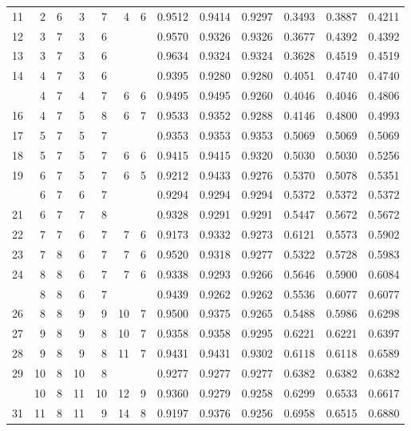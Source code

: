 \begin{Schunk}
\begin{longtable}{rrrrrrrrrrrrr}
11 & 2 & 6 & 3 & 7 & 4 & 6 & 0.9512 & 0.9414 & 0.9297 & 0.3493 & 0.3887 & 0.4211\\
12 & 3 & 7 & 3 & 6 &  &  & 0.9570 & 0.9326 & 0.9326 & 0.3677 & 0.4392 & 0.4392\\
13 & 3 & 7 & 3 & 6 &  &  & 0.9634 & 0.9324 & 0.9324 & 0.3628 & 0.4519 & 0.4519\\
14 & 4 & 7 & 3 & 6 &  &  & 0.9395 & 0.9280 & 0.9280 & 0.4051 & 0.4740 & 0.4740\\
\addlinespace
15 & 4 & 7 & 4 & 7 & 6 & 6 & 0.9495 & 0.9495 & 0.9260 & 0.4046 & 0.4046 & 0.4806\\
16 & 4 & 7 & 5 & 8 & 6 & 7 & 0.9533 & 0.9352 & 0.9288 & 0.4146 & 0.4800 & 0.4993\\
17 & 5 & 7 & 5 & 7 &  &  & 0.9353 & 0.9353 & 0.9353 & 0.5069 & 0.5069 & 0.5069\\
18 & 5 & 7 & 5 & 7 & 6 & 6 & 0.9415 & 0.9415 & 0.9320 & 0.5030 & 0.5030 & 0.5256\\
19 & 6 & 7 & 5 & 7 & 6 & 5 & 0.9212 & 0.9433 & 0.9276 & 0.5370 & 0.5078 & 0.5351\\
\addlinespace
20 & 6 & 7 & 6 & 7 &  &  & 0.9294 & 0.9294 & 0.9294 & 0.5372 & 0.5372 & 0.5372\\
21 & 6 & 7 & 7 & 8 &  &  & 0.9328 & 0.9291 & 0.9291 & 0.5447 & 0.5672 & 0.5672\\
22 & 7 & 7 & 6 & 7 & 7 & 6 & 0.9173 & 0.9332 & 0.9273 & 0.6121 & 0.5573 & 0.5902\\
23 & 7 & 8 & 6 & 7 & 7 & 6 & 0.9520 & 0.9318 & 0.9277 & 0.5322 & 0.5728 & 0.5983\\
24 & 8 & 8 & 6 & 7 & 7 & 6 & 0.9338 & 0.9293 & 0.9266 & 0.5646 & 0.5900 & 0.6084\\
\addlinespace
25 & 8 & 8 & 6 & 7 &  &  & 0.9439 & 0.9262 & 0.9262 & 0.5536 & 0.6077 & 0.6077\\
26 & 8 & 8 & 9 & 9 & 10 & 7 & 0.9500 & 0.9375 & 0.9265 & 0.5488 & 0.5986 & 0.6298\\
27 & 9 & 8 & 9 & 8 & 10 & 7 & 0.9358 & 0.9358 & 0.9295 & 0.6221 & 0.6221 & 0.6397\\
28 & 9 & 8 & 9 & 8 & 11 & 7 & 0.9431 & 0.9431 & 0.9302 & 0.6118 & 0.6118 & 0.6589\\
29 & 10 & 8 & 10 & 8 &  &  & 0.9277 & 0.9277 & 0.9277 & 0.6382 & 0.6382 & 0.6382\\
\addlinespace
30 & 10 & 8 & 11 & 10 & 12 & 9 & 0.9360 & 0.9279 & 0.9258 & 0.6299 & 0.6533 & 0.6617\\
31 & 11 & 8 & 11 & 9 & 14 & 8 & 0.9197 & 0.9376 & 0.9256 & 0.6958 & 0.6515 & 0.6880\\

\end{longtable}
\end{Schunk}
